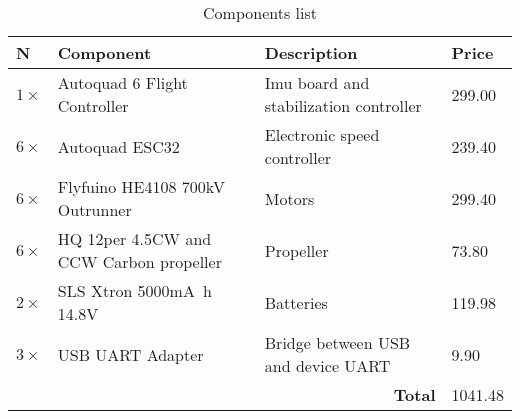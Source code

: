 \begin{table}[h]
	\begin{center}
		\begin{tabular}{ p{0.3cm} p{3.7cm} p{3.7cm} p{1cm} }
			\hline \scriptsize{\textbf{N}} & \footnotesize{\textbf{Component}} & \scriptsize{\textbf{Description}} & \footnotesize{\textbf{Price}} \\ \hline
			\scriptsize{$1\times$} & \footnotesize{Autoquad 6 Flight Controller} & \scriptsize{Imu board and stabilization controller} & \footnotesize{299.00\texteuro} \\
			\scriptsize{$6\times$} & \footnotesize{Autoquad ESC32} & \scriptsize{Electronic speed controller} & \footnotesize{239.40\texteuro} \\
			\scriptsize{$6\times$} & \footnotesize{Flyfuino HE4108 700kV Outrunner} & \scriptsize{Motors} & \footnotesize{299.40\texteuro} \\
			\scriptsize{$6\times$} & \footnotesize{HQ 12\inch per 4.5\inch CW and CCW Carbon propeller} & \scriptsize{Propeller} & \footnotesize{73.80\texteuro} \\
			\scriptsize{$2\times$} & \footnotesize{SLS Xtron \num{5000}\si{\milli\ampere\hour} \num{14.8}\si{\volt}} & \footnotesize{Batteries} & \footnotesize{119.98\texteuro} \\
			\scriptsize{$3\times$} & \footnotesize{USB UART Adapter} & \scriptsize{Bridge between USB and device UART} & \footnotesize{9.90\texteuro} \\
			\hline
			\multicolumn{3}{r}{\footnotesize{\textbf{Total}}}  & \footnotesize{1041.48\texteuro} \\
			\hline
		\end{tabular}
	\end{center}
	\caption{Components list \label{tbl:components_list}}
\end{table}